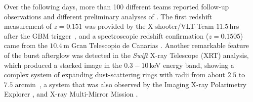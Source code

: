 \documentclass[preprint]{aastex631}
\begin{document}
Over the following days, more than 100 different teams reported follow-up observations and different preliminary analyses of \grb.
The first redshift measurement of $z = 0.151$ was provided by the X-shooter/VLT Team $11.5$\,hrs after the GBM trigger~\citep{2022GCN.32648....1D}, and a spectroscopic redshift confirmation ($z=0.1505$) came from the $10.4$\,m Gran Telescopio de Canarias \citep[GTC,][]{2022GCN.32686....1C}.
Another remarkable feature of the burst afterglow was detected in the {\it Swift} X-ray Telescope (XRT) analysis, which produced a stacked image in the $ 0.3-10$\,keV energy band, showing a complex system of expanding dust-scattering rings with radii from about $2.5$ to $7.5$ arcmin~\citep{2023ApJ...946L..30T, 2023MNRAS.521.1590V}, a system that was also observed by the Imaging X-ray Polarimetry Explorer \citep[IXPE,][]{IXPEpapaer}, and X-ray Multi-Mirror Mission \citep[XMM-Newton,][]{BOAT_XMM}. 
\end{document}
